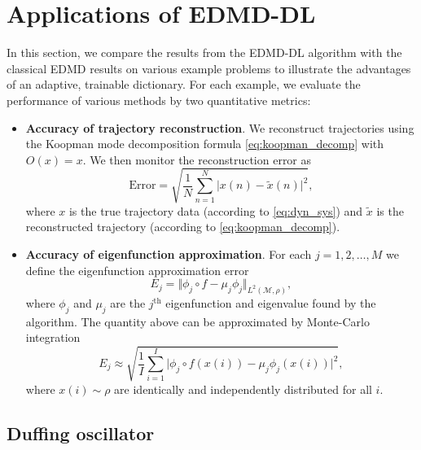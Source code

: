 \documentclass[%
 aip,
 cha,
 sd,%
 amsmath,amssymb,
 preprint,%
]{revtex4-1}
\begin{document}
\section{Applications of EDMD-DL\label{sec:applications}}

In this section, we compare the results from the EDMD-DL algorithm with the classical EDMD results on various example problems to 
illustrate the advantages of an adaptive, trainable dictionary. For each example,
we evaluate the performance of various methods by two quantitative metrics:
\begin{itemize}
	\item \textbf{Accuracy of trajectory reconstruction}. We reconstruct trajectories using the Koopman mode decomposition formula \eqref{eq:koopman_decomp} with $O(x)=x$. We then monitor the reconstruction error as
	\begin{equation}
	\text{Error} = \sqrt{\frac{1}{N}\sum_{n=1}^{N} \vert x(n) - \tilde{x}(n) \vert^2},
	\label{eq:recon_error_def}
	\end{equation}
	where $x$ is the true trajectory data (according to \eqref{eq:dyn_sys}) and $\tilde{x}$ is the reconstructed trajectory (according to \eqref{eq:koopman_decomp}). 
	\item \textbf{Accuracy of eigenfunction approximation}. For each $j=1,2,\dots,M$ we define the eigenfunction approximation error
	\begin{equation}
	E_j = \Vert \phi_j\circ f - \mu_j \phi_j \Vert_{L^2(\mathcal{M},\rho)},
	\label{eq:Ej}
	\end{equation}
	where $\phi_j$ and $\mu_j$ are the $j^\text{th}$ eigenfunction and eigenvalue found by the algorithm. The quantity above can be approximated by Monte-Carlo integration
	\[
	E_j \approx \sqrt{\frac{1}{I}\sum_{i=1}^I \vert \phi_j\circ f(x(i)) - \mu_j \phi_j(x(i)) \vert^2},
	\]
	where $x(i)\sim \rho$ are identically and independently distributed for all $i$. 
\end{itemize}


\subsection{Duffing oscillator}
\end{document}
